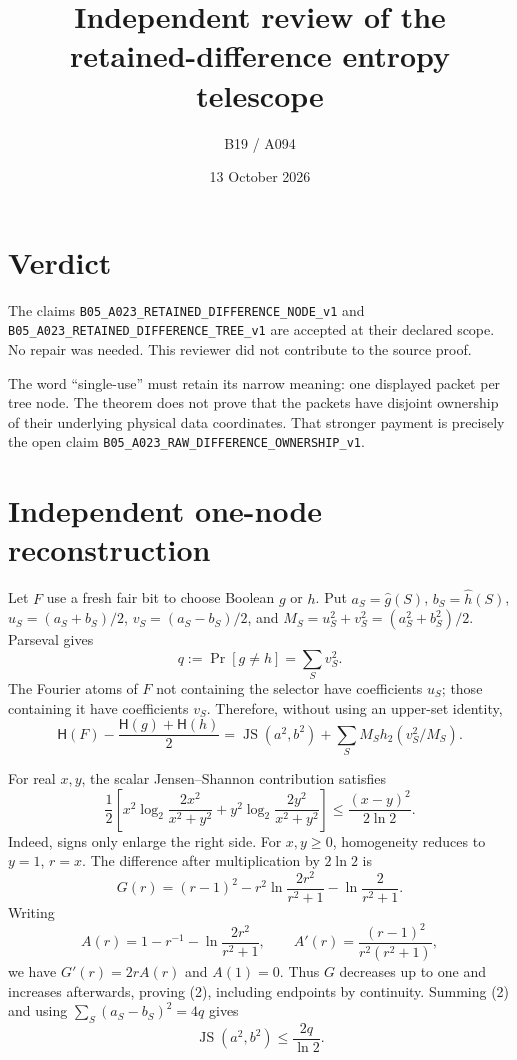 \documentclass[11pt]{article}
\title{Independent review of the retained-difference entropy telescope}
\author{B19 / A094}
\date{13 October 2026}
\newcommand{\cH}{\mathsf H}
\begin{document}
\maketitle

\section{Verdict}

The claims \texttt{B05\_A023\_RETAINED\_DIFFERENCE\_NODE\_v1} and
\texttt{B05\_A023\_RETAINED\_DIFFERENCE\_TREE\_v1} are accepted at their
declared scope.  No repair was needed.  This reviewer did not contribute to
the source proof.

The word ``single-use'' must retain its narrow meaning: one displayed packet
per tree node.  The theorem does not prove that the packets have disjoint
ownership of their underlying physical data coordinates.  That stronger
payment is precisely the open claim
\texttt{B05\_A023\_RAW\_DIFFERENCE\_OWNERSHIP\_v1}.

\section{Independent one-node reconstruction}

Let $F$ use a fresh fair bit to choose Boolean $g$ or $h$.  Put
$a_S=\widehat g(S)$, $b_S=\widehat h(S)$,
$u_S=(a_S+b_S)/2$, $v_S=(a_S-b_S)/2$, and
$M_S=u_S^2+v_S^2=(a_S^2+b_S^2)/2$.  Parseval gives
\[
 q:=\Pr[g\ne h]=\sum_Sv_S^2.
\]
The Fourier atoms of $F$ not containing the selector have coefficients $u_S$;
those containing it have coefficients $v_S$.  Therefore, without using an
upper-set identity,
\[
 \cH(F)-\frac{\cH(g)+\cH(h)}2
 =\operatorname{JS}(a^2,b^2)
  +\sum_SM_Sh_2(v_S^2/M_S).                              \tag{1}
\]

For real $x,y$, the scalar Jensen--Shannon contribution satisfies
\[
 \frac12\left[x^2\log_2\frac{2x^2}{x^2+y^2}
 +y^2\log_2\frac{2y^2}{x^2+y^2}\right]
 \leq \frac{(x-y)^2}{2\ln2}.                            \tag{2}
\]
Indeed, signs only enlarge the right side.  For $x,y\geq0$, homogeneity
reduces to $y=1$, $r=x$.  The difference after multiplication by $2\ln2$ is
\[
 G(r)=(r-1)^2-r^2\ln\frac{2r^2}{r^2+1}
             -\ln\frac2{r^2+1}.
\]
Writing
\[
 A(r)=1-r^{-1}-\ln\frac{2r^2}{r^2+1},
 \qquad A'(r)=\frac{(r-1)^2}{r^2(r^2+1)},
\]
we have $G'(r)=2rA(r)$ and $A(1)=0$.  Thus $G$ decreases up to one and
increases afterwards, proving (2), including endpoints by continuity.
Summing (2) and using $\sum_S(a_S-b_S)^2=4q$ gives
\[
 \operatorname{JS}(a^2,b^2)\leq\frac{2q}{\ln2}.         \tag{3}
\]
\end{document}
